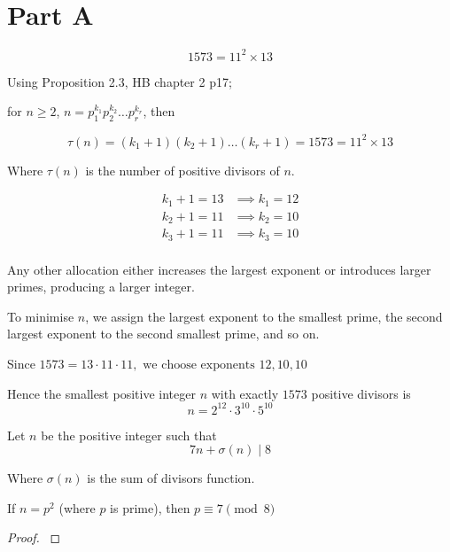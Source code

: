 \documentclass{tufte-handout}
\begin{document}

\section{Part A}

\begin{question}

\qpart

\[ 1573 = 11^{2} \times 13 \]

Using \textup{Proposition 2.3, HB chapter 2 p17};

for \( n \geq 2 \), \( n = p_{1}^{k_1}p_{2}^{k_2}\ldots p_{r}^{k_r} \), then

\[ \tau(n) = (k_{1}+1)(k_{2}+1)\ldots (k_{r}+1) = 1573 = 11^{2} \times 13 \]

Where \( \tau(n) \) is the number of positive divisors of \( n \).

\begin{align*}
k_{1}+1 = 13 &\implies k_{1} = 12 \\[8pt]
k_{2}+1 = 11 &\implies k_{2} = 10 \\[8pt]
k_{3}+1 = 11 &\implies k_{3} = 10 \\[8pt]
\end{align*}

Any other allocation either increases the largest exponent or introduces larger primes, producing a larger integer.

To minimise \( n \), we assign the largest exponent to the smallest prime, the second largest exponent to the 
second smallest prime, and so on.

Since \( 1573 = 13 \cdot 11 \cdot 11, \text{ we choose exponents } 12,10,10 \)

Hence the smallest positive integer \( n \) with exactly \( 1573 \) positive divisors is
\[ \boxed{ n = 2^{12} \cdot 3^{10} \cdot 5^{10} } \]



\vspace{3cm}

\qpart

Let \( n \) be the positive integer such that
\[ 7n + \sigma(n) \mid 8 \]

Where \( \sigma(n) \) is the sum of divisors function.

If \( n = p^{2} \) (where \( p \) is prime), then \( p \equiv 7 \pmod{8} \)

\begin{proof}

$$ \newline


\end{proof}
\end{question}
\end{document}

